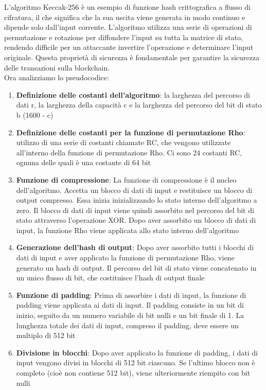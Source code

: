 \documentclass[a4paper,11pt]{report}
\begin{document}
L'algoritmo Keccak-256 è un esempio di funzione hash crittografica a flusso di cifratura, il che significa che la sua uscita viene generata in modo continuo e dipende solo dall'input corrente. L'algoritmo utilizza una serie di operazioni di permutazione e rotazione per diffondere l'input su tutta la matrice di stato, rendendo difficile per un attaccante invertire l'operazione e determinare l'input originale. Questa proprietà di sicurezza è fondamentale per garantire la sicurezza delle transazioni sulla blockchain.\\
Ora analizziamo lo pseudocodice:
\begin{enumerate}
    \item \textbf{Definizione delle costanti dell'algoritmo}: la larghezza del percorso di dati r, la larghezza della capacità c e la larghezza del percorso del bit di stato b (1600 - c)
    \item \textbf{Definizione delle costanti per la funzione di permutazione Rho}: utilizzo di una serie di costanti chiamate RC, che vengono utilizzate all'interno della funzione di permutazione Rho. Ci sono 24 costanti RC, ognuna delle quali è una costante di 64 bit
    \item \textbf{Funzione di compressione}: La funzione di compressione è il nucleo dell'algoritmo. Accetta un blocco di dati di input e restituisce un blocco di output compresso. Essa inizia inizializzando lo stato interno dell'algoritmo a zero. Il blocco di dati di input viene quindi assorbito nel percorso del bit di stato attraverso l'operazione XOR. Dopo aver assorbito un blocco di dati di input, la funzione Rho viene applicata allo stato interno dell'algoritmo
    \item \textbf{Generazione dell'hash di output}: Dopo aver assorbito tutti i blocchi di dati di input e aver applicato la funzione di permutazione Rho, viene generato un hash di output. Il percorso del bit di stato viene concatenato in un unico flusso di bit, che costituisce l'hash di output finale
    \item \textbf{Funzione di padding}: Prima di assorbire i dati di input, la funzione di padding viene applicata ai dati di input. Il padding consiste in un bit di inizio, seguito da un numero variabile di bit nulli e un bit finale di 1. La lunghezza totale dei dati di input, compreso il padding, deve essere un multiplo di 512 bit
    \item \textbf{Divisione in blocchi}: Dopo aver applicato la funzione di padding, i dati di input vengono divisi in blocchi di 512 bit ciascuno. Se l'ultimo blocco non è completo (cioè non contiene 512 bit), viene ulteriormente riempito con bit nulli

\end{enumerate}
\end{document}
